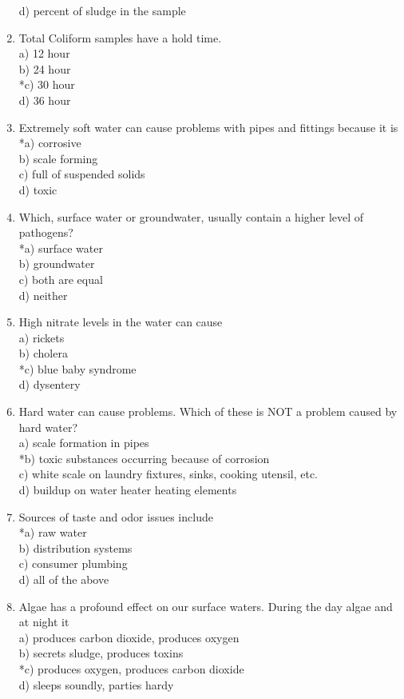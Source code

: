 \begin{enumerate}[1.]
d) percent of sludge in the sample\\
  \item Total Coliform samples have a hold time.\\
a) 12 hour\\
b) 24 hour\\
*c) 30 hour\\
d) 36 hour\\
  \item Extremely soft water can cause problems with pipes and fittings because it is\\
*a) corrosive\\
b) scale forming\\
c) full of suspended solids\\
d) toxic\\
  \item Which, surface water or groundwater, usually contain a higher level of pathogens?\\
*a) surface water\\
b) groundwater\\
c) both are equal\\
d) neither\\
  \item High nitrate levels in the water can cause\\
a) rickets\\
b) cholera\\
*c) blue baby syndrome\\
d) dysentery\\
  \item Hard water can cause problems. Which of these is NOT a problem caused by hard water?\\
a) scale formation in pipes\\
*b) toxic substances occurring because of corrosion\\
c) white scale on laundry fixtures, sinks, cooking utensil, etc.\\
d) buildup on water heater heating elements\\
  \item Sources of taste and odor issues include\\
*a) raw water\\
b) distribution systems\\
c) consumer plumbing\\
d) all of the above\\
  \item Algae has a profound effect on our surface waters. During the day algae and at night it\\
a) produces carbon dioxide, produces oxygen\\
b) secrets sludge, produces toxins\\
*c) produces oxygen, produces carbon dioxide\\
d) sleeps soundly, parties hardy\\


\end{enumerate}
